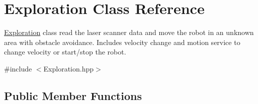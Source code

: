 \hypertarget{class_exploration}{}\section{Exploration Class Reference}
\label{class_exploration}


\hyperlink{class_exploration}{Exploration} class read the laser scanner data and move the robot in an unknown area with obstacle avoidance. Includes velocity change and motion service to change velocity or start/stop the robot.  




{\ttfamily \#include $<$Exploration.\+hpp$>$}

\subsection*{Public Member Functions}
